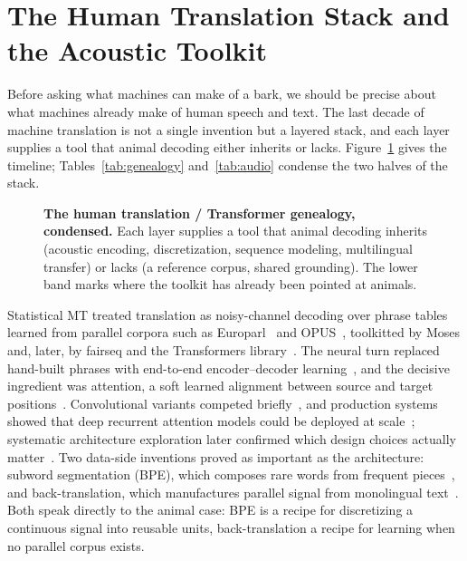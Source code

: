 \section{The Human Translation Stack and the Acoustic Toolkit}
\label{sec:humanmt}
\label{sec:foundationaudio}

Before asking what machines can make of a bark, we should be precise about
what machines already make of human speech and text. The last decade of
machine translation is not a single invention but a layered stack, and each
layer supplies a tool that animal decoding either inherits or lacks.
Figure~\ref{fig:genealogy} gives the timeline; Tables~\ref{tab:genealogy}
and~\ref{tab:audio} condense the two halves of the stack.

\begin{figure}[htbp]
\centering

\caption{\textbf{The human translation / Transformer genealogy, condensed.}
Each layer supplies a tool that animal decoding inherits (acoustic encoding,
discretization, sequence modeling, multilingual transfer) or lacks (a
reference corpus, shared grounding). The lower band marks where the toolkit
has already been pointed at animals.}
\label{fig:genealogy}
\end{figure}

Statistical MT treated translation as noisy-channel decoding over phrase
tables learned from parallel corpora such as Europarl~\cite{koehn2004europarl}
and OPUS~\cite{tiedemann2012opus}, toolkitted by Moses and, later, by
fairseq and the Transformers library~\cite{koehn2005moses,ott2019fairseq,wolf2020transformers}.
The neural turn replaced hand-built phrases with end-to-end encoder--decoder
learning~\cite{sutskever2014seq2seq,cho2014rnn}, and the decisive ingredient
was attention, a soft learned alignment between source and target
positions~\cite{bahdanau2015attention,luong2015effective}. Convolutional
variants competed briefly~\cite{gehring2017conv}, and production systems
showed that deep recurrent attention models could be deployed at
scale~\cite{wu2016gnmt,ott2018scaling}; systematic architecture exploration
later confirmed which design choices actually matter~\cite{britz2017massive}. Two data-side inventions proved as
important as the architecture: subword segmentation (BPE), which composes
rare words from frequent pieces~\cite{sennrich2016bpe}, and back-translation,
which manufactures parallel signal from monolingual
text~\cite{sennrich2016improving,edunov2018backtrans}. Both speak directly to
the animal case: BPE is a recipe for discretizing a continuous signal into
reusable units, back-translation a recipe for learning when no parallel
corpus exists.

